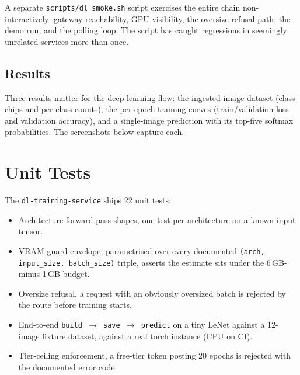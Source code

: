 \documentclass[12pt, a4paper, oneside]{report}
\begin{document}
A separate \texttt{scripts/dl\_smoke.sh} script exercises the entire
chain non-interactively: gateway reachability, GPU visibility, the
oversize-refusal path, the demo run, and the polling loop. The
script has caught regressions in seemingly unrelated services more
than once.

\subsection{Results}

Three results matter for the deep-learning flow: the ingested image
dataset (class chips and per-class counts), the per-epoch training
curves (train/validation loss and validation accuracy), and a
single-image prediction with its top-five softmax probabilities. The
screenshots below capture each.


\section{Unit Tests}

The \texttt{dl-training-service} ships 22 unit tests:

\begin{itemize}
    \item Architecture forward-pass shapes, one test per
        architecture on a known input tensor.
    \item VRAM-guard envelope, parametrised over every
        documented \texttt{(arch, input\_size, batch\_size)}
        triple, asserts the estimate sits under the
        6\,GB-minus-1\,GB budget.
    \item Oversize refusal, a request with an obviously oversized
        batch is rejected by the route before training starts.
    \item End-to-end \texttt{build $\to$ save $\to$ predict} on
        a tiny LeNet against a 12-image fixture dataset, against
        a real torch instance (CPU on CI).
    \item Tier-ceiling enforcement, a free-tier token posting
        20 epochs is rejected with the documented error code.
\end{itemize}
\end{document}
